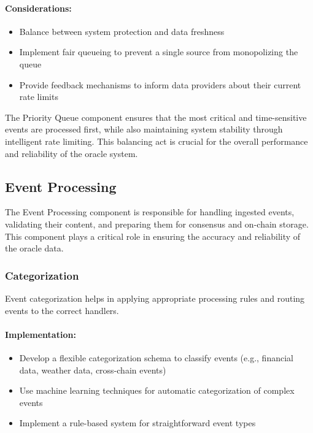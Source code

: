 \documentclass[12pt,a4paper]{article}
\begin{document}
	\paragraph{Considerations:}
	\begin{itemize}
		\item Balance between system protection and data freshness
		\item Implement fair queueing to prevent a single source from monopolizing the queue
		\item Provide feedback mechanisms to inform data providers about their current rate limits
	\end{itemize}
	
	The Priority Queue component ensures that the most critical and time-sensitive events are processed first, while also maintaining system stability through intelligent rate limiting. This balancing act is crucial for the overall performance and reliability of the oracle system.
	
	\subsection{Event Processing}
	The Event Processing component is responsible for handling ingested events, validating their content, and preparing them for consensus and on-chain storage. This component plays a critical role in ensuring the accuracy and reliability of the oracle data.
	
	\subsubsection{Categorization}
	Event categorization helps in applying appropriate processing rules and routing events to the correct handlers.
	
	\paragraph{Implementation:}
	\begin{itemize}
		\item Develop a flexible categorization schema to classify events (e.g., financial data, weather data, cross-chain events)
		\item Use machine learning techniques for automatic categorization of complex events
		\item Implement a rule-based system for straightforward event types
	\end{itemize}
	
\end{document}
